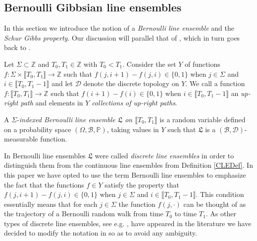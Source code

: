 %
\subsection{Bernoulli Gibbsian line ensembles}\label{Section2.2}
In this section we introduce the notion of a {\em Bernoulli line ensemble} and the {\em Schur Gibbs property}. Our discussion will parallel that of \cite[Section 3.1]{CD}, which in turn goes back to \cite[Section 2.1]{CorHamK}.

\begin{definition}\label{DefDLE}
Let $\Sigma \subset \mathbb{Z}$ and $T_0, T_1 \in \mathbb{Z}$ with $T_0 < T_1$. Consider the set $Y$ of functions $f: \Sigma \times \llbracket T_0, T_1 \rrbracket \rightarrow \mathbb{Z}$ such that $f(j, i+1) - f(j,i) \in \{0, 1\}$ when $j \in \Sigma$ and $i \in\llbracket T_0, T_1 -1 \rrbracket$ and let $\mathcal{D}$ denote the discrete topology on $Y$. We call a function $f: \llbracket T_0, T_1 \rrbracket \rightarrow \mathbb{Z}$ such that $f( i+1) - f(i) \in \{0, 1\}$ when $i \in\llbracket T_0, T_1 -1 \rrbracket$  an {\em up-right path} and elements in $Y$ {\em collections of up-right paths}. 

A $\Sigma$-{\em indexed Bernoulli line ensemble $\mathfrak{L}$ on $\llbracket T_0, T_1 \rrbracket$}  is a random variable defined on a probability space $(\Omega, \mathcal{B}, \mathbb{P})$, taking values in $Y$ such that $\mathfrak{L}$ is a $(\mathcal{B}, \mathcal{D})$-measurable function. 
\end{definition}

\begin{remark} In \cite[Section 3.1]{CD} Bernoulli line ensembles $\mathfrak{L}$ were called {\em discrete line ensembles} in order to distinguish them from the continuous line ensembles from Definition \ref{CLEDef}. In this paper we have opted to use the term Bernoulli line ensembles to emphasize the fact that the functions $f \in Y$ satisfy the property that $f(j, i+1) - f(j,i) \in \{0, 1\}$ when $j \in \Sigma$ and $i \in\llbracket T_0, T_1 -1 \rrbracket$. This condition essentially means that for each $j \in \Sigma$ the function $f(j, \cdot)$ can be thought of as the trajectory of a Bernoulli random walk from time $T_0$ to time $T_1$. As other types of discrete line ensembles, see e.g. \cite{Wu19}, have appeared in the literature we have decided to modify the notation in \cite[Section 3.1]{CD} so as to avoid any ambiguity.
\end{remark}


